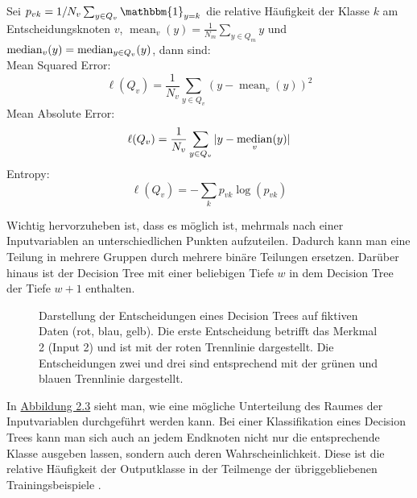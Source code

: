 Sei $p_{vk} = 1/N_v \sum_{y \in Q_v} \mathbbm{1}_{y = k}$
die relative H\"aufigkeit der Klasse $k$ am Entscheidungsknoten $v$, $\operatorname{mean}_v(y) = \frac{1}{N_m}\sum_{y\in Q_m}y$ und $ \operatorname*{median}_v(y) = \operatorname*{median}_{y \in Q_v}(y)$, dann sind: \\


Mean Squared Error:  $$ \ell(Q_v) = \frac{1}{N_v} \sum_{y\in Q_v} (y - \operatorname{mean}_v(y))^2 $$
Mean Absolute Error: $$ \ell(Q_v) = \frac{1}{N_v} \sum_{y\in Q_v} |y - \operatorname*{median}_v(y)| $$
Entropy: $$ \ell(Q_v) = - \sum_{k} p_{vk}\log(p_{vk}) $$


Wichtig hervorzuheben ist, dass es m\"oglich ist, mehrmals nach einer Inputvariablen an unterschiedlichen Punkten aufzuteilen.
Dadurch kann man eine Teilung in mehrere Gruppen durch mehrere bin\"are Teilungen ersetzen.
Dar\"uber hinaus ist der Decision Tree mit einer beliebigen Tiefe $w$ in dem Decision Tree der Tiefe $w + 1$ enthalten.

\begin{figure}[ht]
	\label{fig:rf2}
	\begin{center}
		\begin{tiny}
		\end{tiny}
	\end{center}
	\caption[Regression eines Random Forest Modells]
	{Darstellung der Entscheidungen eines Decision Trees auf fiktiven Daten (rot, blau, gelb). Die erste Entscheidung
		betrifft das Merkmal 2 (Input 2) und ist mit der roten Trennlinie dargestellt. Die Entscheidungen zwei und drei sind
		entsprechend mit der gr\"unen und blauen Trennlinie dargestellt.}
\end{figure}



In \hyperref[fig:rf2]{Abbildung 2.3} sieht man, wie eine m\"ogliche Unterteilung des
Raumes der Inputvariablen durchgef\"uhrt werden kann. Bei einer Klassifikation eines Decision Trees kann man sich auch an jedem Endknoten nicht nur die entsprechende Klasse
ausgeben lassen, sondern auch deren Wahrscheinlichkeit. Diese ist die relative H\"aufigkeit der Outputklasse in der Teilmenge der \"ubriggebliebenen Trainingsbeispiele \cite{sklearn}.































